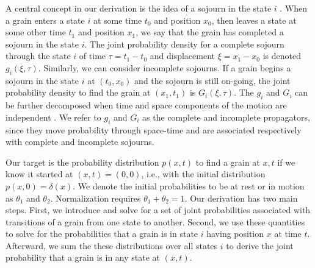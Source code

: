 \documentclass[]{agujournal2018}
\begin{document}
A central concept in our derivation is the idea of a sojourn in the state $i$ \citep{Weiss1994}.
When a grain enters a state $i$ at some time $t_0$ and position $x_0$, then leaves a state at some other time $t_1$ and position $x_1$, we say that the grain has completed a sojourn in the state $i$. The joint probability density for a complete sojourn through the state $i$ of time $\tau = t_1-t_0$ and displacement $\xi = x_1-x_0$ is denoted $g_i(\xi,\tau).$ Similarly, we can consider incomplete sojourns. If a grain begins a sojourn in the state $i$ at $(t_0,x_0)$ and the sojourn is still on-going, the joint probability density to find the grain at $(x_1,t_1)$ is $G_i(\xi,\tau)$. The $g_i$ and $G_i$ can be further decomposed when time and space components of the motion are independent \citep{Weiss1994}.
We refer to $g_i$ and $G_i$ as the complete and incomplete propagators, since they move probability through space-time and are associated respectively with complete and incomplete sojourns.

Our target is the probability distribution $p(x,t)$ to find a grain at $x,t$ if we know it started at $(x,t)=(0,0)$, i.e., with the initial distribution $p(x,0)=\delta(x)$.
We denote the initial probabilities to be at rest or in motion as $\theta_1$ and $\theta_2$. 
Normalization requires $\theta_1+\theta_2=1$.
Our derivation has two main steps.
First, we introduce and solve for a set of joint probabilities associated with transitions of a grain from one state to another.
Second, we use these quantities to solve for the probabilities that a grain is in state $i$ having position $x$ at time $t$.
Afterward, we sum the these distributions over all states $i$ to derive the joint probability that a grain is in any state at $(x,t)$.
\end{document}
